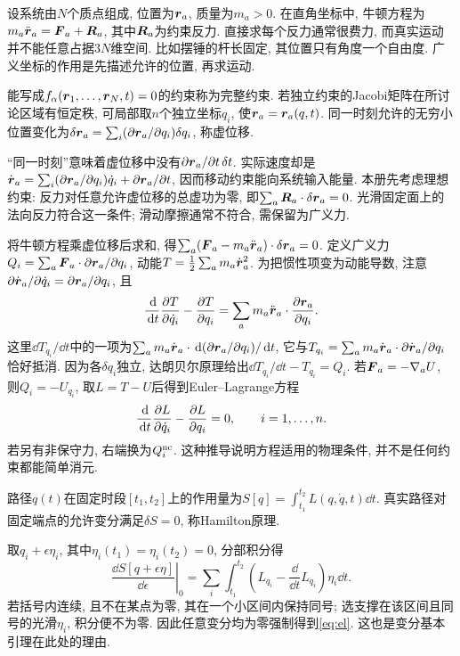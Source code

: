 设系统由$N$个质点组成, 位置为$\boldsymbol{r}_a$, 质量为$m_a>0$. 在直角坐标中, 牛顿方程为$m_a\ddot{\boldsymbol{r}}_a=\boldsymbol{F}_a+\boldsymbol{R}_a$, 其中$\boldsymbol{R}_a$为约束反力. 直接求每个反力通常很费力, 而真实运动并不能任意占据$3N$维空间. 比如摆锤的杆长固定, 其位置只有角度一个自由度. 广义坐标的作用是先描述允许的位置, 再求运动.

\begin{definition}
能写成$f_\alpha(\boldsymbol{r}_1,\ldots,\boldsymbol{r}_N,t)=0$的约束称为完整约束. 若独立约束的Jacobi矩阵在所讨论区域有恒定秩, 可局部取$n$个独立坐标$q_i$, 使$\boldsymbol{r}_a=\boldsymbol{r}_a(q,t)$. 同一时刻允许的无穷小位置变化为$\delta\boldsymbol{r}_a=\sum_i(\partial\boldsymbol{r}_a/\partial q_i)\delta q_i$, 称虚位移.
\end{definition}
“同一时刻”意味着虚位移中没有$\partial\boldsymbol{r}_a/\partial t\,\delta t$. 实际速度却是$\dot{\boldsymbol{r}}_a=\sum_i(\partial\boldsymbol{r}_a/\partial q_i)\dot q_i+\partial\boldsymbol{r}_a/\partial t$, 因而移动约束能向系统输入能量. 本册先考虑理想约束: 反力对任意允许虚位移的总虚功为零, 即$\sum_a\boldsymbol{R}_a\cdot\delta\boldsymbol{r}_a=0$. 光滑固定面上的法向反力符合这一条件; 滑动摩擦通常不符合, 需保留为广义力.

将牛顿方程乘虚位移后求和, 得$\sum_a(\boldsymbol{F}_a-m_a\ddot{\boldsymbol{r}}_a)\cdot\delta\boldsymbol{r}_a=0$. 定义广义力$Q_i=\sum_a\boldsymbol{F}_a\cdot\partial\boldsymbol{r}_a/\partial q_i$, 动能$T=\frac12\sum_am_a\dot{\boldsymbol{r}}_a^2$. 为把惯性项变为动能导数, 注意$\partial\dot{\boldsymbol{r}}_a/\partial\dot q_i=\partial\boldsymbol{r}_a/\partial q_i$, 且
\[
\frac{\,\mathrm d}{\,\mathrm d t}\frac{\partial T}{\partial \dot q_i}-\frac{\partial T}{\partial q_i}
=\sum_a m_a\ddot{\boldsymbol{r}}_a\cdot\frac{\partial \boldsymbol{r}_a}{\partial q_i}.
\]
这里$\dd T_{\dot q_i}/\dd t$中的一项为$\sum_am_a\dot{\boldsymbol{r}}_a\cdot\,\mathrm d(\partial\boldsymbol{r}_a/\partial q_i)/\,\mathrm d t$, 它与$T_{q_i}=\sum_am_a\dot{\boldsymbol{r}}_a\cdot\partial\dot{\boldsymbol{r}}_a/\partial q_i$恰好抵消. 因为各$\delta q_i$独立, 达朗贝尔原理给出$\dd T_{\dot q_i}/\dd t-T_{q_i}=Q_i$. 若$\boldsymbol{F}_a=-\nabla_aU$, 则$Q_i=-U_{q_i}$, 取$L=T-U$后得到Euler--Lagrange方程
\begin{equation}\label{eq:el}
\frac{\,\mathrm d}{\,\mathrm d t}\frac{\partial L}{\partial \dot q_i}-\frac{\partial L}{\partial q_i}=0,\qquad i=1,\ldots,n.
\end{equation}
若另有非保守力, 右端换为$Q_i^{\rm nc}$. 这种推导说明方程适用的物理条件, 并不是任何约束都能简单消元.

\begin{definition}
路径$q(t)$在固定时段$[t_1,t_2]$上的作用量为$S[q]=\int_{t_1}^{t_2}L(q,\dot q,t)\dd t$. 真实路径对固定端点的允许变分满足$\delta S=0$, 称Hamilton原理.
\end{definition}
取$q_i+\epsilon\eta_i$, 其中$\eta_i(t_1)=\eta_i(t_2)=0$, 分部积分得
\[
\left.\frac{\dd S[q+\epsilon\eta]}{\dd\epsilon}\right|_0
=\sum_i\int_{t_1}^{t_2}\left(L_{q_i}-\frac{\dd}{\dd t}L_{\dot q_i}\right)\eta_i\dd t.
\]
若括号内连续, 且不在某点为零, 其在一个小区间内保持同号; 选支撑在该区间且同号的光滑$\eta_i$, 积分便不为零. 因此任意变分均为零强制得到\eqref{eq:el}. 这也是变分基本引理在此处的理由.

